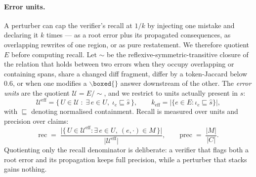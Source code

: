 \documentclass{article} %
\begin{document}
\paragraph{Error units.} A perturber can cap the verifier's recall at $1/k$ by injecting one
mistake and declaring it $k$ times --- as a root error plus its propagated consequences, as
overlapping rewrites of one region, or as pure restatement. We therefore quotient $E$ before
computing recall. Let $\sim$ be the reflexive-symmetric-transitive closure of the relation
that holds between two errors when they occupy overlapping or containing spans, share a
changed diff fragment, differ by a token-Jaccard below $0.6$, or when one modifies a
$\backslash\texttt{boxed}\{\}$ answer downstream of the other. The \emph{error units} are the
quotient $\mathcal{U} = E/\!\sim$, and we restrict to units actually present in $\hat{s}$:
\begin{equation}
\mathcal{U}^{\mathrm{eff}} = \{\, U \in \mathcal{U} \;:\; \exists\, e \in U,\; \iota_e \sqsubseteq \hat{s} \,\},
\qquad
k_{\mathrm{eff}} = \big|\{ e \in E : \iota_e \sqsubseteq \hat{s}\}\big|,
\end{equation}
with $\sqsubseteq$ denoting normalised containment. Recall is measured over units and
precision over claims:
\begin{equation}
\mathrm{rec} \;=\; \frac{\big|\{\,U \in \mathcal{U}^{\mathrm{eff}} : \exists\, e \in U,\ (e,\cdot) \in M \,\}\big|}{\big|\mathcal{U}^{\mathrm{eff}}\big|},
\qquad
\mathrm{prec} \;=\; \frac{|M|}{|C|}.
\label{eq:recprec}
\end{equation}
Quotienting only the recall denominator is deliberate: a verifier that flags both a root
error and its propagation keeps full precision, while a perturber that stacks gains nothing.
\end{document}
